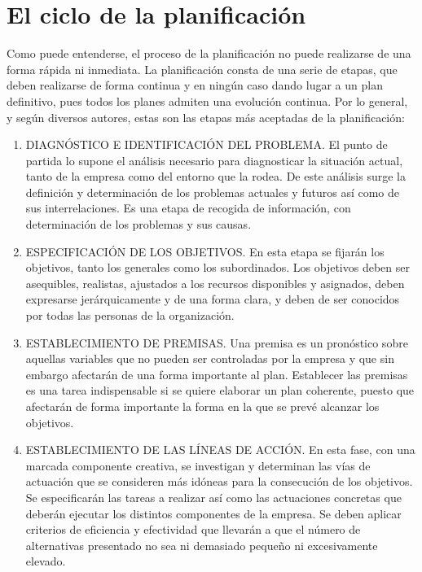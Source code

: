 \documentclass[
]{krantz}
\providecommand{\tightlist}{%
  \setlength{\itemsep}{0pt}\setlength{\parskip}{0pt}}
\begin{document}
\hypertarget{el-ciclo-de-la-planificaciuxf3n}{%
\section{El ciclo de la planificación}\label{el-ciclo-de-la-planificaciuxf3n}}

Como puede entenderse, el proceso de la planificación no puede realizarse de una forma rápida ni inmediata. La planificación consta de una serie de etapas, que deben realizarse de forma continua y en ningún caso dando lugar a un plan definitivo, pues todos los planes admiten una evolución continua. Por lo general, y según diversos autores, estas son las etapas más aceptadas de la planificación:

\begin{enumerate}
\def\labelenumi{\arabic{enumi}.}
\tightlist
\item
  DIAGNÓSTICO E IDENTIFICACIÓN DEL PROBLEMA. El punto de partida lo supone el análisis necesario para diagnosticar la situación actual, tanto de la empresa como del entorno que la rodea. De este análisis surge la definición y determinación de los problemas actuales y futuros así como de sus interrelaciones. Es una etapa de recogida de información, con determinación de los problemas y sus causas.
\item
  ESPECIFICACIÓN DE LOS OBJETIVOS. En esta etapa se fijarán los objetivos, tanto los generales como los subordinados. Los objetivos deben ser asequibles, realistas, ajustados a los recursos disponibles y asignados, deben expresarse jerárquicamente y de una forma clara, y deben de ser conocidos por todas las personas de la organización.
\item
  ESTABLECIMIENTO DE PREMISAS. Una premisa es un pronóstico sobre aquellas variables que no pueden ser controladas por la empresa y que sin embargo afectarán de una forma importante al plan. Establecer las premisas es una tarea indispensable si se quiere elaborar un plan coherente, puesto que afectarán de forma importante la forma en la que se prevé alcanzar los objetivos.
\item
  ESTABLECIMIENTO DE LAS LÍNEAS DE ACCIÓN. En esta fase, con una marcada componente creativa, se investigan y determinan las vías de actuación que se consideren más idóneas para la consecución de los objetivos. Se especificarán las tareas a realizar así como las actuaciones concretas que deberán ejecutar los distintos componentes de la empresa. Se deben aplicar criterios de eficiencia y efectividad que llevarán a que el número de alternativas presentado no sea ni demasiado pequeño ni excesivamente elevado.

\end{enumerate}
\end{document}
